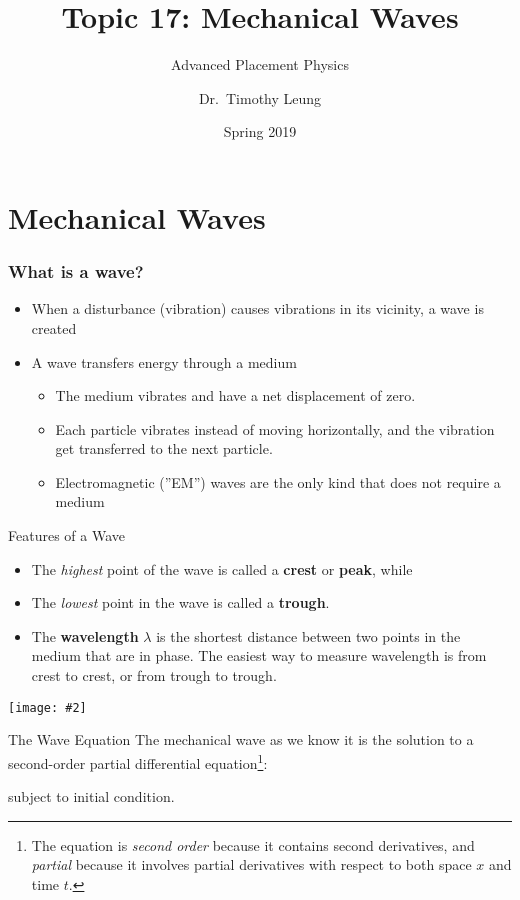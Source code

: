 \documentclass[12pt,aspectratio=169]{beamer}
\title[Waves]{Topic 17: Mechanical Waves}
\subtitle{Advanced Placement Physics}
\author[TML]{Dr.\ Timothy Leung}
\institute{Olympiads School}
\date{Spring 2019}
\newcommand{\pic}[2]{\texttt{[image: \#2]}}
\newcommand{\eq}[2]{\vspace{#1}{\Large\begin{displaymath}#2\end{displaymath}}}
\begin{document}
\begin{frame}
  \titlepage
\end{frame}



\section{Mechanical Waves}
\begin{frame}
  \frametitle{What is a wave?}
  \begin{itemize}
  \item When a disturbance (vibration) causes vibrations in its vicinity, a
    wave is created
  \item A wave transfers energy through a medium
    \begin{itemize}
    \item The medium vibrates and have a net displacement of zero.
    \item Each particle vibrates instead of moving horizontally, and the
      vibration get transferred to the next particle.
    \item Electromagnetic (''EM'') waves are the only kind that does not
      require a medium
    \end{itemize}
  \end{itemize}
\end{frame}



\begin{frame}{Features of a Wave}
  \begin{itemize}
  \item The \emph{highest} point of the wave is called a \textbf{crest} or
    \textbf{peak}, while
  \item The \emph{lowest} point in the wave is called a \textbf{trough}.
  \item The \textbf{wavelength} $\lambda$ is the shortest distance between two
    points in the medium that are in phase. The easiest way to measure
    wavelength is from crest to crest, or from trough to trough.
  \end{itemize}
  \begin{center}
    \vspace{-.4in}\pic{.8}{sine-wave1.png}
  \end{center}
\end{frame}


\begin{frame}{The Wave Equation}
  The mechanical wave as we know it is the solution to a second-order partial
  differential equation\footnote{The equation is \emph{second order} because
    it contains second derivatives, and \emph{partial} because it involves
    partial derivatives with respect to both space $x$ and time $t$.}:
  
  \eq{-.2in}{
    \frac{\partial^2 u}{\partial t^2}=c^2\frac{\partial^2 u}{\partial x^2}
  }

  subject to initial condition.
\end{frame}
\end{document}
